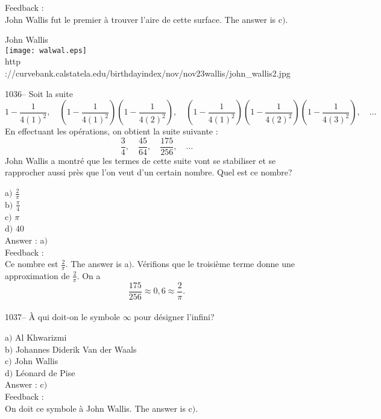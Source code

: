 \documentclass[letterpaper, 12pt]{article}
\begin{document}
Feedback :\\
John Wallis fut le premier \`a trouver l'aire de cette surface.
The answer is c$)$.\\

        \begin{center}
        John Wallis\\
    \texttt{[image: walwal.eps]}\\
        {\footnotesize http
://curvebank.calstatela.edu/birthdayindex/nov/nov23wallis/john\_wallis2.jpg}
    \end{center}

1036-- Soit la suite
$$\displaystyle{1-\frac1{4(1)^2},\quad\left(1-\frac1{4(1)^2}\right)\left(1-\frac1{4(2)^2}\right),\quad
\left(1-\frac1{4(1)^2}\right)\left(1-\frac1{4(2)^2}\right)\left(1-\frac1{4(3)^2}\right),\quad\ldots}$$
En effectuant les op\'erations, on obtient la suite suivante :
$$\displaystyle{\frac34,\quad\frac{45}{64},\quad\frac{175}{256},\quad\ldots}$$
John Wallis a montr\'e que les termes de cette suite vont se
stabiliser et se rapprocher aussi pr\`es que l'on veut d'un certain
nombre. Quel est ce nombre?

a$)$ $\frac2{\pi}$ \\[2mm]
b$)$ $\frac{\pi}4$  \\[2mm]
c$)$ $\pi$  \\[2mm]
d$)$ $40$\\

Answer : a$)$\\

Feedback :\\
Ce nombre est $\frac2{\pi}$. The answer is a$)$. V\'erifions que
le troisi\`eme terme donne une approximation de $\frac2{\pi}$. On a
$$\displaystyle{\frac{175}{256}\approx0,6\approx\frac2{\pi}}.$$
\\

1037-- \`A qui doit-on le symbole $\infty$ pour d\'esigner l'infini?

a$)$ Al Khwarizmi \\
b$)$ Johannes Diderik Van der Waals   \\
c$)$ John Wallis  \\
d$)$ L\'eonard de Pise \\

Answer : c$)$\\

Feedback :\\
On doit ce symbole \`a John Wallis.
The answer is c$)$.\\
\end{document}
